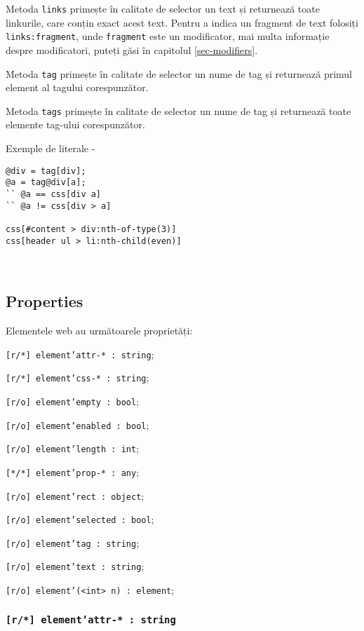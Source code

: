 Metoda \texttt{links} primește în calitate de selector un text și returnează toate linkurile, care conțin exact acest text. Pentru a indica un fragment de text folosiți \texttt{links:fragment}, unde \texttt{fragment} este un modificator, mai multa informație despre modificatori, puteți găsi în capitolul \ref{sec-modifiers}.

Metoda \texttt{tag} primește în calitate de selector un nume de tag și returnează primul element al tagului corespunzător.

Metoda \texttt{tags} primește în calitate de selector un nume de tag și returnează toate elemente tag-ului corespunzător.

Exemple de literale -
\begin{verbatim}
@div = tag[div];
@a = tag@div[a];
`` @a == css[div a]
`` @a != css[div > a]

css[#content > div:nth-of-type(3)]
css[header ul > li:nth-child(even)]
\end{verbatim}

\

\subsection{Properties}

Elementele web au următoarele proprietăți:
\begin{icItems}
\item \texttt{[r/*] element'attr-* : string};
\item \texttt{[r/*] element'css-* : string};
\item \texttt{[r/o] element'empty : bool};
\item \texttt{[r/o] element'enabled : bool};
\item \texttt{[r/o] element'length : int};
\item \texttt{[*/*] element'prop-* : any};
\item \texttt{[r/o] element'rect : object};
\item \texttt{[r/o] element'selected : bool};
\item \texttt{[r/o] element'tag : string};
\item \texttt{[r/o] element'text : string};
\item \texttt{[r/o] element'(<int> n) : element};
\end{icItems} 

\subsubsection{\texttt{[r/*] element'attr-* : string}}

